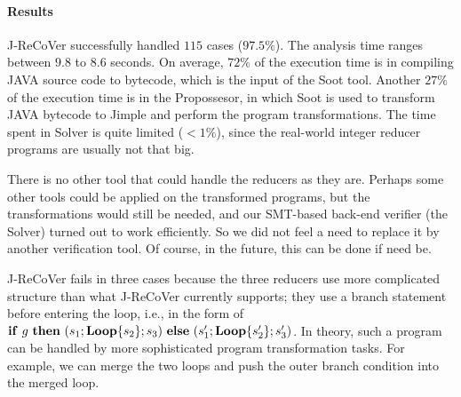 \documentclass{llncs}
\newcommand{\ite}[3]{
	 \ifmmode
	 \mathbf{if}\ #1 \ \mathbf{then}\ #2\  \mathbf{else}\ #3
	 \else
	 \textbf{if}\ #1 \ \textbf{then}\ #2\  \textbf{else}\ #3
	 \fi}
\newcommand{\rloop}{
	\ifmmode
	\mathbf{Loop}
	\else
	\textbf{Loop}
	\fi}
\begin{document}
\paragraph*{Results} 

J-ReCoVer successfully handled $115$ cases ($97.5\%$). The analysis time ranges between $9.8$ to $8.6$ seconds. 
On average, $72\%$ of the execution time is in compiling JAVA source code to bytecode, which is the input of the Soot tool. Another $27\%$ of the execution time is in the Propossesor, in which Soot is used to transform JAVA bytecode to Jimple and perform the program transformations. The time spent in Solver is quite limited ($<1\%$), since the real-world integer reducer programs are usually not that big. 

There is no other tool that could handle the reducers as they are. Perhaps some other tools could be applied on the transformed programs, but the transformations would still be needed, and our SMT-based back-end verifier (the Solver) turned out to work efficiently. So we did not feel a need to replace it by another verification tool. Of course, in the future, this can be done if need be.

J-ReCoVer fails in three cases because the three reducers use more complicated structure than what J-ReCoVer currently supports; they use a branch statement before entering the loop, i.e., in the form of  $\ite{g}{(s_1;\rloop\{s_2\};s_3)}{(s'_1;\rloop\{s'_2\};s'_3)}$. In theory, such a program can be handled by more sophisticated program transformation tasks. For example, we can merge the two loops and push the outer branch condition into the merged loop.

 
\end{document}
